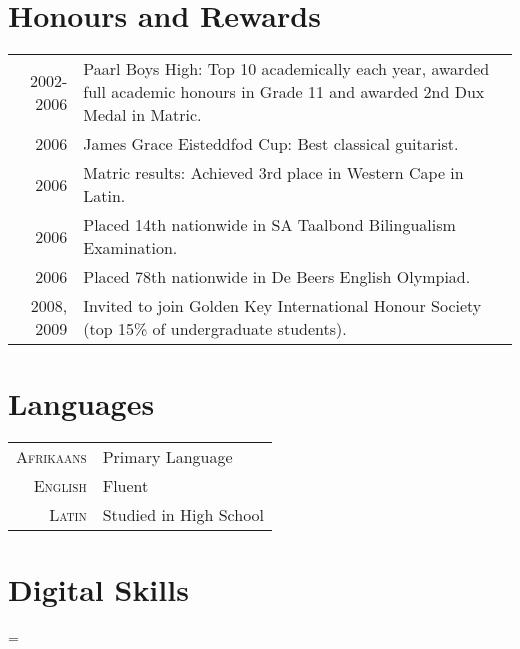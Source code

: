 \documentclass[a4paper,10pt,notitlepage]{article}
\newenvironment{absolutelynopagebreak}
  {\par\nobreak\vfil\penalty0\vfilneg
   \vtop\bgroup}
  {\par\xdef\tpd{\the\prevdepth}\egroup
   \prevdepth=\tpd}
\begin{document}
\begin{absolutelynopagebreak}

\section{Honours and Rewards}
	\begin{tabular}{r|p{11cm}}
		\textsc{2002-2006}  & Paarl Boys High: Top 10 academically each year, awarded full academic honours in Grade 11 and awarded 2nd Dux Medal in Matric. \\
		\textsc{2006}       & James Grace Eisteddfod Cup: Best classical guitarist.                                                                          \\
		\textsc{2006}       & Matric results: Achieved 3rd place in Western Cape in Latin.                                                                   \\
		\textsc{2006}       & Placed 14th nationwide in SA Taalbond Bilingualism Examination.                                                                \\
		\textsc{2006}       & Placed 78th nationwide in De Beers English Olympiad.                                                                           \\
		\textsc{2008, 2009} & Invited to join Golden Key International Honour Society (top 15\% of undergraduate students).                                  
	\end{tabular}


\addtolength{\voffset}{-0.4cm} %
	
	\section{Languages}
	\begin{tabular}{r|p{11cm}}
		\textsc{Afrikaans} & Primary Language       \\
		\textsc{English}   & Fluent                 \\
		\textsc{Latin}     & Studied in High School \\
	\end{tabular}
	
	\section{Digital Skills}
	

\end{absolutelynopagebreak}
\end{document}
